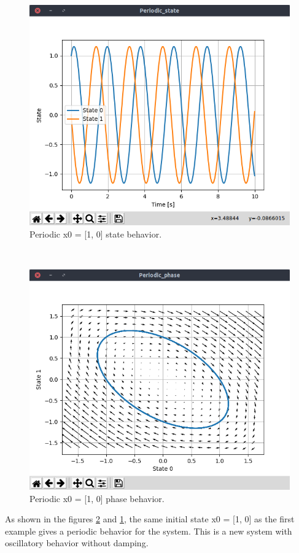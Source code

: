 \documentclass{cmc}
\begin{document}
\begin{minipage}[t]{0.49\textwidth}
	\begin{figure}[H]
		\centering
  		\includegraphics[width=\textwidth,trim={0 1.25cm 0 0},clip]{figures/ex2_periodic_state.png}
  		\caption{Periodic x0 = [1, 0] state behavior.}
  		\label{fig:ex2_periodic_state}
	\end{figure}
\end{minipage}
~
\begin{minipage}[t]{0.49\textwidth}
	\begin{figure}[H]
  		\centering
  		\includegraphics[width=\textwidth,trim={0 1.25cm 0 0},clip]{figures/ex2_periodic_phase.png}
  		\caption{Periodic x0 = [1, 0] phase behavior.}
  		\label{fig:ex2_periodic_phase}
	\end{figure}
\end{minipage}

As shown in the figures \ref{fig:ex2_periodic_phase} and \ref{fig:ex2_periodic_state}, the same initial state x0 = [1, 0] as the first example gives a periodic behavior for the system. This is a new system with oscillatory behavior without damping.
\end{document}
